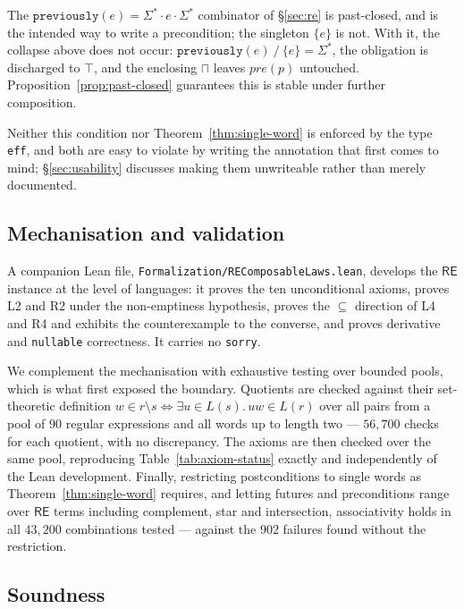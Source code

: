 \documentclass[acmsmall,screen]{acmart}
\newcommand{\RE}{\mathsf{RE}}
\newcommand{\pre}{\mathit{pre}}
\newcommand{\previously}[1]{\mathtt{previously}(#1)}
\newcommand{\lquot}{\mathbin{\setminus}}   %
\newcommand{\rquot}{\mathbin{/}}           %
\begin{document}
The $\previously{e} = \Sigma^* \cdot e \cdot \Sigma^*$ combinator of
\S\ref{sec:re} is past-closed, and is the intended way to write a
precondition; the singleton $\{e\}$ is not.
With it, the collapse above does not occur: $\previously{e} \rquot \{e\}
= \Sigma^*$, the obligation is discharged to $\top$, and the enclosing
$\sqcap$ leaves $\pre(p)$ untouched.
Proposition~\ref{prop:past-closed} guarantees this is stable under further
composition.

Neither this condition nor Theorem~\ref{thm:single-word} is enforced by the
type \lstinline{eff}, and both are easy to violate by writing the
annotation that first comes to mind; \S\ref{sec:usability} discusses making
them unwriteable rather than merely documented.

\subsection{Mechanisation and validation}
\label{sec:mechanisation}

A companion Lean file, \texttt{Formalization/REComposableLaws.lean},
develops the $\RE$ instance at the level of languages: it proves the ten
unconditional axioms, proves L2 and R2 under the non-emptiness hypothesis,
proves the $\subseteq$ direction of L4 and R4 and exhibits the
counterexample to the converse, and proves derivative and
\lstinline{nullable} correctness.
It carries no \lstinline{sorry}.

We complement the mechanisation with exhaustive testing over bounded pools,
which is what first exposed the boundary.
Quotients are checked against their set-theoretic definition
$w \in r \lquot s \iff \exists u \in L(s).\, uw \in L(r)$
over all pairs from a pool of $90$ regular expressions and all words up to
length two --- $56{,}700$ checks for each quotient, with no discrepancy.
The axioms are then checked over the same pool, reproducing
Table~\ref{tab:axiom-status} exactly and independently of the Lean
development.
Finally, restricting postconditions to single words as
Theorem~\ref{thm:single-word} requires, and letting futures and
preconditions range over $\RE$ terms including complement, star and
intersection, associativity holds in all $43{,}200$ combinations tested ---
against the $902$ failures found without the restriction.

\subsection{Soundness}
\label{sec:soundness}
\end{document}
